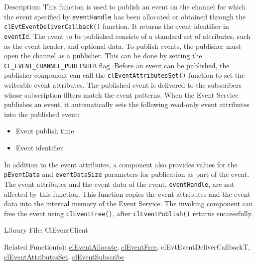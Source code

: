 \begin{flushleft}
\begin{Desc}
\begin{description}
\end{description}
\end{Desc}
\begin{Desc}
\item[Description:] This function is used to publish an event on the channel for which the event specified by {\tt{eventHandle}} has been allocated or 
obtained through the {\tt{clEvtEventDeliverCallback()}} function. It returns the event identifier in {\tt{eventId}}. The event to be published consists of a standard 
set of attributes, such as the event header, and optional data. To publish events, the publisher must open the channel as a publisher. This can
be done by setting the {\tt{CL\_\-EVENT\_\-CHANNEL\_\-PUBLISHER}} flag. Before an event can be published, the publisher component can call the 
{\tt{clEventAttributesSet()}} function to set the writeable event attributes. The published event is delivered to the subscribers whose subscription filters
match the event patterns.
When the Event Service publishes an event, it automatically sets the following read-only event attributes into the published event:
\begin{itemize}
\item
Event publish time
\item
Event identifier
\end{itemize}
In addition to the event attributes, a component also provides values for the {\tt{pEventData}} and 
{\tt{eventDataSize}} parameters for publication as part of the event. The event attributes and the event data of the event, {\tt{eventHandle}}, are not 
affected by this function. This function copies the event attributes and the event data into the internal memory of the Event Service. The invoking 
component can free the event using {\tt{clEventFree()}}, after {\tt{clEventPublish()}} returns successfully.  
\end{Desc}
\begin{Desc}
\item[Library File:]Cl\-Event\-Client\end{Desc}
\begin{Desc}
\item[Related Function(s):]\hyperlink{pageem107}{cl\-Event\-Allocate}, \hyperlink{pageem108}{cl\-Event\-Free}, cl\-Evt\-Event\-Deliver\-Callback\-T,
\hyperlink{pageem109}{cl\-Event\-Attributes\-Set}, \hyperlink{pageem114}{cl\-Event\-Subscribe} \end{Desc}
\newpage



\end{flushleft}
